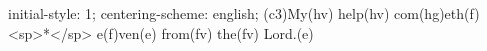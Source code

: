 initial-style: 1;
centering-scheme: english;
(c3)My(hv) help(hv) com(hg)eth(f) <sp>*</sp> e(f)ven(e) from(fv) the(fv) Lord.(e)